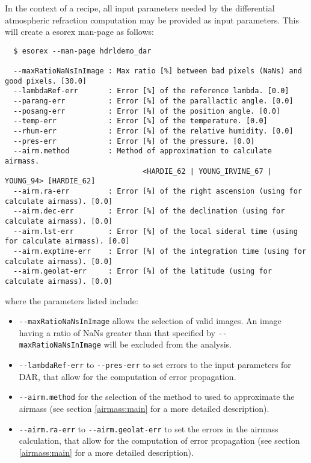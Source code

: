 In the context of a recipe, all input parameters needed by the differential atmospheric refraction computation may be provided as input parameters. 
This will create a esorex man-page as follows:
{\footnotesize
  \begin{verbatim}
  $ esorex --man-page hdrldemo_dar
  
  --maxRatioNaNsInImage : Max ratio [%] between bad pixels (NaNs) and good pixels. [30.0]
  --lambdaRef-err       : Error [%] of the reference lambda. [0.0]
  --parang-err          : Error [%] of the parallactic angle. [0.0]
  --posang-err          : Error [%] of the position angle. [0.0]
  --temp-err            : Error [%] of the temperature. [0.0]
  --rhum-err            : Error [%] of the relative humidity. [0.0]
  --pres-err            : Error [%] of the pressure. [0.0]
  --airm.method         : Method of approximation to calculate airmass. 
                                <HARDIE_62 | YOUNG_IRVINE_67 | YOUNG_94> [HARDIE_62]
  --airm.ra-err         : Error [%] of the right ascension (using for calculate airmass). [0.0]
  --airm.dec-err        : Error [%] of the declination (using for calculate airmass). [0.0]
  --airm.lst-err        : Error [%] of the local sideral time (using for calculate airmass). [0.0]
  --airm.exptime-err    : Error [%] of the integration time (using for calculate airmass). [0.0]
  --airm.geolat-err     : Error [%] of the latitude (using for calculate airmass). [0.0]
  \end{verbatim}
}
where the parameters listed include:
\begin{itemize}
    \item  \verb+--maxRatioNaNsInImage+ allows the selection of valid images.  An image having a ratio of NaNs greater than that specified by \verb+--maxRatioNaNsInImage+ will be excluded
    from the analysis.
    \item \verb+--lambdaRef-err+ to \verb+--pres-err+ to set errors to the input parameters for DAR, that allow for the computation of error propagation.
    \item \verb+--airm.method+ for the selection of the method to used to approximate the airmass (see section \ref{airmass:main} for a more detailed description).
    \item \verb+--airm.ra-err+ to \verb+--airm.geolat-err+ to set the errors in the airmass calculation, that allow for the computation of error propagation (see section \ref{airmass:main} for a more detailed description).
\end{itemize}

